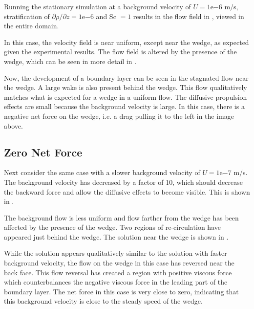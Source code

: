 \documentclass[12pt]{article}
\begin{document}
Running the stationary simulation at a background velocity of $U=1$e$-6$ m/s, stratification of $\partial\rho/\partial z = 1$e$-6$ and Sc $=1$ results in the flow field in , viewed in the entire domain.


In this case, the velocity field is near uniform, except near the wedge, as expected given the experimental results. The flow field is altered by the presence of the wedge, which can be seen in more detail in .


Now, the development of a boundary layer can be seen in the stagnated flow near the wedge. A large wake is also present behind the wedge. This flow qualitatively matches what is expected for a wedge in a uniform flow. The diffusive propulsion effects are small because the background velocity is large. In this case, there is a negative net force on the wedge, i.e. a drag pulling it to the left in the image above.

\subsection{Zero  Net Force}

Next consider the same case with a slower background velocity of $U=1$e$-7$ m/s. The background velocity has decreased by a factor of 10, which should decrease the backward force and allow the diffusive effects to become visible. This is shown in .


The background flow is less uniform and flow farther from the wedge has been affected by the presence of the wedge. Two regions of re-circulation have appeared just behind the wedge. The solution near the wedge is shown in .


While the solution appears qualitatively similar to the solution with faster background velocity, the flow on the wedge in this case has reversed near the back face. This flow reversal has created a region with positive viscous force which counterbalances the negative viscous force in the leading part of the boundary layer. The net force in this case is very close to zero, indicating that this background velocity is close to the steady speed of the wedge.
\end{document}
